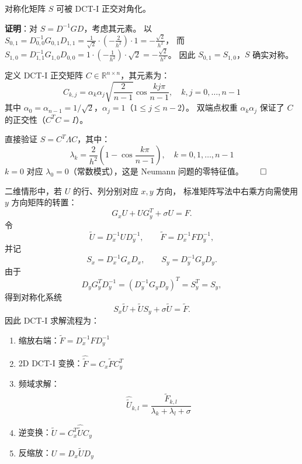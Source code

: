\begin{theorem}
  \label{thm:symmetrize}
  对称化矩阵 $S$ 可被 DCT-I 正交对角化。

  \textbf{证明}：对 $S = D^{-1}GD$，考虑其元素。
  以 $S_{0,1} = D^{-1}_{0,0} G_{0,1} D_{1,1} = \frac{1}{\sqrt{2}} \cdot (-\frac{2}{h^2}) \cdot 1 = -\frac{\sqrt{2}}{h^2}$，
  而 $S_{1,0} = D^{-1}_{1,1} G_{1,0} D_{0,0} = 1 \cdot (-\frac{1}{h^2}) \cdot \sqrt{2} = -\frac{\sqrt{2}}{h^2}$。
  因此 $S_{0,1} = S_{1,0}$，$S$ 确实对称。

  定义 DCT-I 正交矩阵 $C \in \mathbb{R}^{n \times n}$，其元素为：
  \begin{equation}
    C_{k,j} = \alpha_k \alpha_j \sqrt{\frac{2}{n-1}} \cos\frac{kj\pi}{n-1}, \quad k,j = 0, \ldots, n-1
    \label{eq:dct1_def}
  \end{equation}
  其中 $\alpha_0 = \alpha_{n-1} = 1/\sqrt{2}$，$\alpha_j = 1$（$1 \leq j \leq n-2$）。
  双端点权重 $\alpha_k \alpha_j$ 保证了 $C$ 的正交性（$C^T C = I$）。

  直接验证 $S = C^T \Lambda C$，其中：
  \begin{equation}
    \lambda_k = \frac{2}{h^2}(1 - \cos\frac{k\pi}{n-1}), \quad k = 0, 1, \ldots, n-1
  \end{equation}
  $k=0$ 对应 $\lambda_0 = 0$（常数模式），这是 Neumann 问题的零特征值。$\qed$

  二维情形中，若 $U$ 的行、列分别对应 $x,y$ 方向，
  标准矩阵写法中右乘方向需使用 $y$ 方向矩阵的转置：
  \[
    G_xU+UG_y^T+\sigma U=F.
  \]
  令
  \[
    \tilde{U}=D_x^{-1}UD_y^{-1},\qquad
    \tilde{F}=D_x^{-1}FD_y^{-1},
  \]
  并记
  \[
    S_x=D_x^{-1}G_xD_x,\qquad
    S_y=D_y^{-1}G_yD_y.
  \]
  由于
  \[
    D_yG_y^TD_y^{-1}
    =
    (D_y^{-1}G_yD_y)^T
    =
    S_y^T
    =
    S_y,
  \]
  得到对称化系统
  \[
    S_x\tilde{U}+\tilde{U}S_y+\sigma\tilde{U}=\tilde{F}.
  \]
  因此 DCT-I 求解流程为：
  \begin{enumerate}[itemsep=1pt]
    \item 缩放右端：$\tilde{F}=D_x^{-1}FD_y^{-1}$
    \item 2D DCT-I 变换：$\widehat{\tilde{F}} = C_x \tilde{F} C_y^T$
    \item 频域求解：
    \[
      \widehat{\tilde{U}}_{k,l}
      = \frac{\widehat{\tilde{F}}_{k,l}}{\lambda_k + \lambda_l + \sigma}
    \]
    \item 逆变换：$\tilde{U} = C_x^T \widehat{\tilde{U}} C_y$
    \item 反缩放：$U = D_x \tilde{U} D_y$
  \end{enumerate}
\end{theorem}
